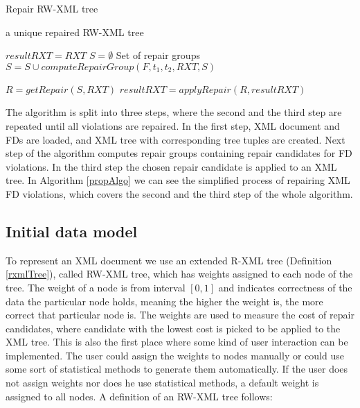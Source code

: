 \begin{algorithm}
\caption{Repair RW-XML tree}
\label{propAlgo}
\begin{algorithmic}[1]
\ENSURE a unique repaired RW-XML tree

\STATE $resultRXT = RXT$
    \STATE $S = \emptyset$ \COMMENT Set of repair groups
		    \STATE $S = S \cup computeRepairGroup(F, t_1, t_2, RXT, S)$
	    \ENDFOR
    \ENDFOR

    \STATE $R = getRepair(S, RXT)$
    \STATE $resultRXT = applyRepair(R, resultRXT)$
\ENDWHILE

\end{algorithmic}
\end{algorithm}

The algorithm is split into three steps, where the second and the third step are repeated until all violations are repaired. In the first step, XML document and FDs are loaded, and XML tree with corresponding tree tuples are created. Next step of the algorithm computes repair groups containing repair candidates for FD violations. In the third step the chosen repair candidate is applied to an XML tree. In Algorithm \ref{propAlgo} we can see the simplified process of repairing XML FD violations, which covers the second and the third step of the whole algorithm.

\subsection{Initial data model}

To represent an XML document we use an extended R-XML tree (Definition \ref{rxmlTree}), called RW-XML tree, which has weights assigned to each node of the tree. The weight of a node is from interval $[0,1]$ and indicates correctness of the data the particular node holds, meaning the higher the weight is, the more correct that particular node is. The weights are used to measure the cost of repair candidates, where candidate with the lowest cost is picked to be applied to the XML tree. This is also the first place where some kind of user interaction can be implemented. The user could assign the weights to nodes manually or could use some sort of statistical methods to generate them automatically. If the user does not assign weights nor does he use statistical methods, a default weight is assigned to all nodes. A definition of an RW-XML tree follows:

